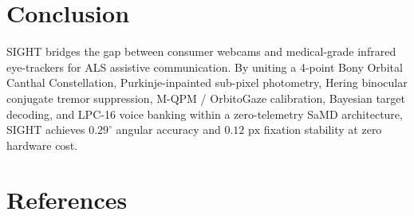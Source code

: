 \documentclass[twocolumn,10pt]{article}
\begin{document}
\section{Conclusion}
SIGHT bridges the gap between consumer webcams and medical-grade infrared eye-trackers for ALS assistive communication. By uniting a 4-point Bony Orbital Canthal Constellation, Purkinje-inpainted sub-pixel photometry, Hering binocular conjugate tremor suppression, M-QPM / OrbitoGaze calibration, Bayesian target decoding, and LPC-16 voice banking within a zero-telemetry SaMD architecture, SIGHT achieves $0.29^\circ$ angular accuracy and $0.12\text{ px}$ fixation stability at zero hardware cost.

\section*{References}
\end{document}
